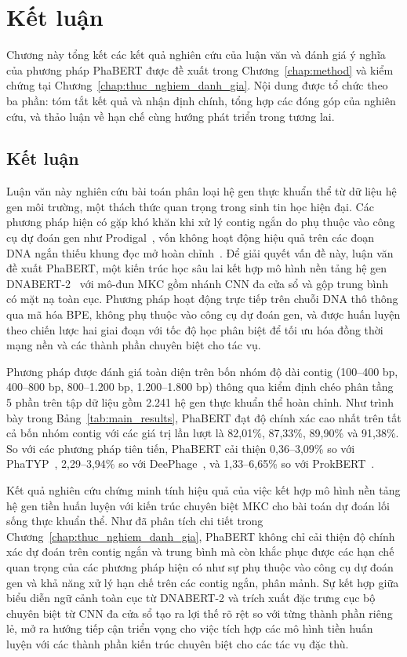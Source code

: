 \chapter{Kết luận}
\label{chap:conclusion}

Chương này tổng kết các kết quả nghiên cứu của luận văn và đánh giá ý nghĩa của phương pháp PhaBERT được đề xuất trong Chương~\ref{chap:method} và kiểm chứng tại Chương~\ref{chap:thuc_nghiem_danh_gia}. Nội dung được tổ chức theo ba phần: tóm tắt kết quả và nhận định chính, tổng hợp các đóng góp của nghiên cứu, và thảo luận về hạn chế cùng hướng phát triển trong tương lai.

\section{Kết luận}
\label{sec:conclusion}

Luận văn này nghiên cứu bài toán phân loại hệ gen thực khuẩn thể từ dữ liệu hệ gen môi trường, một thách thức quan trọng trong sinh tin học hiện đại. Các phương pháp hiện có gặp khó khăn khi xử lý contig ngắn do phụ thuộc vào công cụ dự đoán gen như Prodigal~\cite{hyatt2010prodigal}, vốn không hoạt động hiệu quả trên các đoạn DNA ngắn thiếu khung đọc mở hoàn chỉnh~\cite{trimble2012short}. Để giải quyết vấn đề này, luận văn đề xuất PhaBERT, một kiến trúc học sâu lai kết hợp mô hình nền tảng hệ gen DNABERT-2~\cite{zhou2023dnabert} với mô-đun MKC gồm nhánh CNN đa cửa sổ và gộp trung bình có mặt nạ toàn cục. Phương pháp hoạt động trực tiếp trên chuỗi DNA thô thông qua mã hóa BPE, không phụ thuộc vào công cụ dự đoán gen, và được huấn luyện theo chiến lược hai giai đoạn với tốc độ học phân biệt để tối ưu hóa đồng thời mạng nền và các thành phần chuyên biệt cho tác vụ.

Phương pháp được đánh giá toàn diện trên bốn nhóm độ dài contig (100--400 bp, 400--800 bp, 800--1.200 bp, 1.200--1.800 bp) thông qua kiểm định chéo phân tầng 5 phần trên tập dữ liệu gồm 2.241 hệ gen thực khuẩn thể hoàn chỉnh. Như trình bày trong Bảng~\ref{tab:main_results}, PhaBERT đạt độ chính xác cao nhất trên tất cả bốn nhóm contig với các giá trị lần lượt là 82,01\%, 87,33\%, 89,90\% và 91,38\%. So với các phương pháp tiên tiến, PhaBERT cải thiện 0,36--3,09\% so với PhaTYP~\cite{shang2023phatyp}, 2,29--3,94\% so với DeePhage~\cite{wu2021deephage}, và 1,33--6,65\% so với ProkBERT~\cite{ligeti2024prokbert}.

Kết quả nghiên cứu chứng minh tính hiệu quả của việc kết hợp mô hình nền tảng hệ gen tiền huấn luyện với kiến trúc chuyên biệt MKC cho bài toán dự đoán lối sống thực khuẩn thể. Như đã phân tích chi tiết trong Chương~\ref{chap:thuc_nghiem_danh_gia}, PhaBERT không chỉ cải thiện độ chính xác dự đoán trên contig ngắn và trung bình mà còn khắc phục được các hạn chế quan trọng của các phương pháp hiện có như sự phụ thuộc vào công cụ dự đoán gen và khả năng xử lý hạn chế trên các contig ngắn, phân mảnh. Sự kết hợp giữa biểu diễn ngữ cảnh toàn cục từ DNABERT-2 và trích xuất đặc trưng cục bộ chuyên biệt từ CNN đa cửa sổ tạo ra lợi thế rõ rệt so với từng thành phần riêng lẻ, mở ra hướng tiếp cận triển vọng cho việc tích hợp các mô hình tiền huấn luyện với các thành phần kiến trúc chuyên biệt cho các tác vụ đặc thù.

